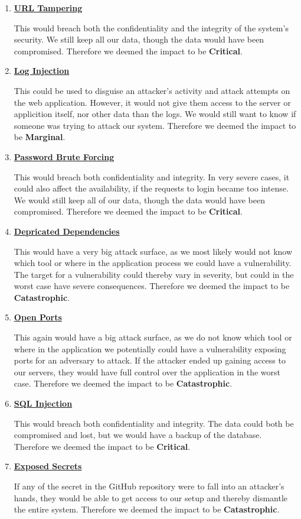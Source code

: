 \begin{enumerate}
    \item \textbf{\underline{URL Tampering}}

    This would breach both the confidentiality and the integrity of the system's security. We still keep all our data, though the data would have been compromised. Therefore we deemed the impact to be \textbf{Critical}.
    \item \textbf{\underline{Log Injection}}

    This could be used to disguise an attacker's activity and attack attempts on the web application. However, it would not give them access to the server or applicition itself, nor other data than the logs. We would still want to know if someone was trying to attack our system. Therefore we deemed the impact to be \textbf{Marginal}.
    \item \textbf{\underline{Password Brute Forcing}}

    This would breach both confidentiality and integrity. In very severe cases, it could also affect the availability, if the requests to login became too intense. We would still keep all of our data, though the data would have been compromised. Therefore we deemed the impact to be \textbf{Critical}.
    \item \textbf{\underline{Depricated Dependencies}}

    This would have a very big attack surface, as we most likely would not know which tool or where in the application process we could have a vulnerability. The target for a vulnerability could thereby vary in severity, but could in the worst case have severe consequences. Therefore we deemed the impact to be \textbf{Catastrophic}.
    \item \textbf{\underline{Open Ports}}

    This again would have a big attack surface, as we do not know which tool or where in the application we potentially could have a vulnerability exposing ports for an adversary to attack. If the attacker ended up gaining access to our servers, they would have full control over the application in the worst case. Therefore we deemed the impact to be \textbf{Catastrophic}.
    \item \textbf{\underline{SQL Injection}}

    This would breach both confidentiality and integrity. The data could both be compromised and lost, but we would have a backup of the database. Therefore we deemed the impact to be \textbf{Critical}.
    \item \textbf{\underline{Exposed Secrets}}

    If any of the secret in the GitHub repository were to fall into an attacker's hands, they would be able to get access to our setup and thereby dismantle the entire system. Therefore we deemed the impact to be \textbf{Catastrophic}.
\end{enumerate}
